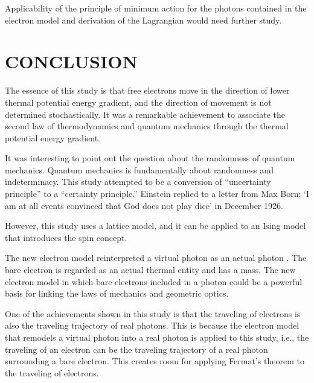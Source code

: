 \documentclass[reprint,amsmath,amssymb,aps,]{revtex4-1}
\numberwithin{equation}{section}%
\begin{document}
    Applicability of the principle of minimum action for the photons contained in the electron model and derivation of the Lagrangian would need further study.
    

\section{\label{sec:CONCLUSION}CONCLUSION}


    The essence of this study is that free electrons move in the direction of lower thermal potential energy gradient, and the direction of movement is not determined stochastically. It was a remarkable achievement to associate the second law of thermodynamics and quantum mechanics through the thermal potential energy gradient.

    It was interesting to point out the question about the randomness of quantum mechanics. Quantum mechanics is fundamentally about randomness and indeterminacy. This study attempted to be a conversion of ``uncertainty principle'' to a ``certainty principle.''  Einstein replied to a letter from Max Born; `I am at all events convinced that God does not play dice' in December 1926. 

    However, this study uses a lattice model, and it can be applied to an Ising model that introduces the spin concept.
    
    The new electron model reinterpreted a virtual photon as an actual photon \cite{Hanamura1}. The bare electron is regarded as an actual thermal entity and has a mass. The new electron model in which bare electrons included in a photon could be a powerful basis for linking the laws of mechanics and geometric optics.
    
    One of the achievements shown in this study is that the traveling of electrons is also the traveling trajectory of real photons. This is because the electron model that remodels a virtual photon into a real photon is applied to this study, i.e., the traveling of an electron can be the traveling trajectory of a real photon surrounding a bare electron. This creates room for applying Fermat's theorem to the traveling of electrons.
    
\end{document}
